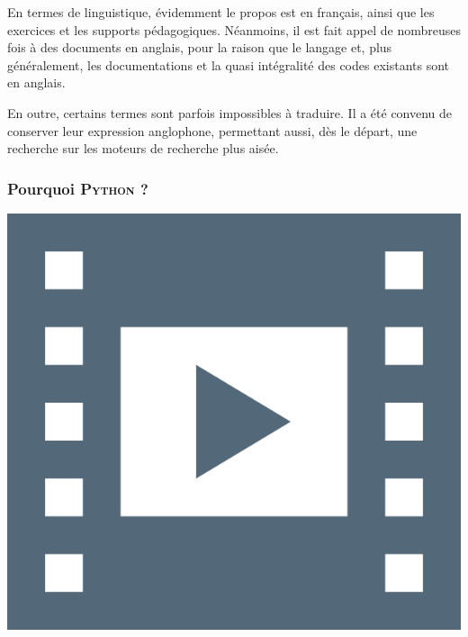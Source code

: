 En termes de linguistique, évidemment le propos est en français, ainsi que les exercices et les supports pédagogiques. Néanmoins, il est fait appel de nombreuses fois à des documents en anglais, pour la raison que le langage et, plus généralement, les documentations et la quasi intégralité des codes existants sont en anglais. 

En outre, certains termes sont parfois impossibles à traduire. Il a été convenu de conserver leur expression anglophone, permettant aussi, dès le départ, une recherche sur les moteurs de recherche plus aisée.


\subsubsection[Pourquoi \textsc{Python} ?]{Pourquoi \textsc{Python} ?}
\label{subsub:X.1.1.2}

\begin{marginvideo}
	[\label{vid:X.2}Choix de \textsc{Python}.]%
	\href{https://www.youtube.com/watch?v=FNVhm0w3FwA&list=PL2CXLryTKuwwoPO9s_fd5a4eRoWgHhrKT&index=3}%
		{\includegraphics[width=\marginparwidth]{./Images/Pictograms/film-strip-dark-electric-blue.png}}%
\end{marginvideo}

